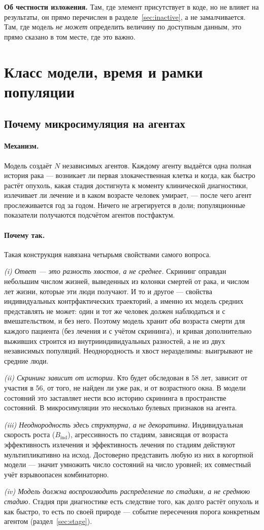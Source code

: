 \documentclass[12pt,a4paper]{article}
\newcommand{\mech}[1]{\paragraph{Механизм.} #1}
\newcommand{\why}[1]{\paragraph{Почему так.} #1}
\begin{document}
\textbf{Об честности изложения.} Там, где элемент присутствует в коде, но не влияет на результаты, он прямо
перечислен в разделе~\ref{sec:inactive}, а не замалчивается. Там, где модель \emph{не может} определить
величину по доступным данным, это прямо сказано в том месте, где это важно.

\section{Класс модели, время и рамки популяции}

\subsection{Почему микросимуляция на агентах}

\mech{Модель создаёт $N$ независимых агентов. Каждому агенту выдаётся одна полная история рака ---
возникает ли первая злокачественная клетка и когда, как быстро растёт опухоль, какая стадия достигнута к
моменту клинической диагностики, излечивает ли лечение и в каком возрасте человек умирает, --- после чего
агент прослеживается год за годом. Ничего не агрегируется в доли; популяционные показатели получаются
подсчётом агентов постфактум.}

\why{Такая конструкция навязана четырьмя свойствами самого вопроса.

\emph{(i) Ответ --- это разность хвостов, а не среднее.} Скрининг оправдан небольшим числом жизней,
выведенных из колонки смертей от рака, и числом лет жизни, которые эти люди получают. И то и другое ---
свойства индивидуальных контрфактических траекторий, а именно их модель средних представлять не может:
один и тот же человек должен наблюдаться и с вмешательством, и без него. Поэтому модель хранит
\emph{оба} возраста смерти для каждого пациента (без лечения и с учётом скрининга), и кривая
дополнительно выживших строится из внутрииндивидуальных разностей, а не из двух независимых популяций.
Неоднородность и хвост неразделимы: выигрывают не средние люди.

\emph{(ii) Скрининг зависит от истории.} Кто будет обследован в 58 лет, зависит от участия в 56, от того,
не найден ли уже рак, и от возрастного окна. В модели состояний это заставляет нести всю историю
скрининга в пространстве состояний. В микросимуляции это несколько булевых признаков на агента.

\emph{(iii) Неоднородность здесь структурна, а не декоративна.} Индивидуальная скорость роста
($B_{\text{ind}}$), агрессивность по стадиям, зависящая от возраста эффективность излечения и
эффективность лечения по стадиям действуют мультипликативно на исход. Достоверно представить любую из них
в когортной модели --- значит умножить число состояний на число уровней; их совместный учёт взрывоопасен
комбинаторно.

\emph{(iv) Модель должна воспроизводить распределение по стадиям, а не среднюю стадию.} Стадия при
диагностике есть следствие того, как долго растёт опухоль и как быстро, то есть по своей природе ---
событие пересечения порога конкретным агентом (раздел~\ref{sec:stage}).}
\end{document}
